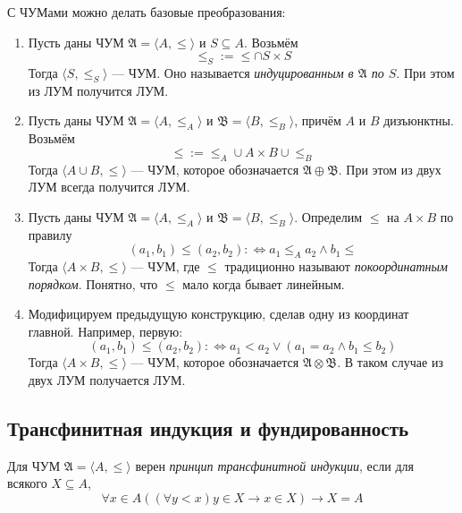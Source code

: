 \documentclass[12pt,a4paper]{article}
\begin{document}
    С ЧУМами можно делать базовые преобразования:
    \begin{enumerate}
        \item Пусть даны ЧУМ $\mathfrak{A} = \langle A, {\leqslant} \rangle$ и $S \subseteq A$. Возьмём
            \[ {\leqslant}_S := {\leqslant} \cap S \times S\]
            Тогда $\langle S, {\leqslant}_S \rangle$ --- ЧУМ. Оно называется \emph{индуцированным в $\mathfrak{A}$ по $S$}. При этом из ЛУМ получится ЛУМ.
        \item Пусть даны ЧУМ $\mathfrak{A} = \langle A, {\leqslant}_A \rangle$ и $\mathfrak{B} = \langle B, {\leqslant}_B \rangle$, причём $A$ и $B$ дизъюнктны. Возьмём
            \[{\leqslant} := {\leqslant}_A \cup A \times B \cup {\leqslant}_B\]
            Тогда $\langle A \cup B, {\leqslant} \rangle$ --- ЧУМ, которое обозначается $\mathfrak{A} \oplus \mathfrak{B}$. При этом из двух ЛУМ всегда получится ЛУМ.
        \item Пусть даны ЧУМ $\mathfrak{A} = \langle A, {\leqslant}_A \rangle$ и $\mathfrak{B} = \langle B, {\leqslant}_B \rangle$. Определим $\leqslant$ на $A \times B$ по правилу
            \[(a_1, b_1) \leqslant (a_2, b_2) :\Leftrightarrow a_1 \leqslant_A a_2 \wedge b_1 \leqslant \]
            Тогда $\langle A \times B, {\leqslant} \rangle$ --- ЧУМ, где $\leqslant$ традиционно называют \emph{покоординатным порядком}. Понятно, что $\leqslant$ мало когда бывает линейным.
        \item Модифицируем предыдущую конструкцию, сделав одну из координат главной. Например, первую:
            \[(a_1, b_1) \leqslant (a_2, b_2) :\Leftrightarrow a_1 < a_2 \vee (a_1 = a_2 \wedge b_1 \leqslant b_2)\]
            Тогда $\langle A \times B, {\leqslant} \rangle$ --- ЧУМ, которое обозначается $\mathfrak{A} \otimes \mathfrak{B}$. В таком случае из двух ЛУМ получается ЛУМ.
    \end{enumerate}

    \subsection{Трансфинитная индукция и фундированность}

    \begin{definition}
        Для ЧУМ $\mathfrak{A} = \langle A, {\leqslant} \rangle$ верен \emph{принцип трансфинитной индукции}, если для всякого $X \subseteq A$,
        \[\forall x \in A ((\forall y < x) y \in X \rightarrow x \in X) \rightarrow X = A\]
    \end{definition}
\end{document}
